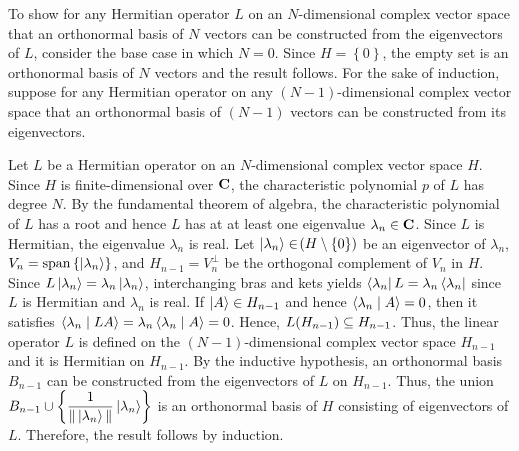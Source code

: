 \begin{answer}
	To show for any Hermitian operator $L$ on an $N$-dimensional complex vector space that an orthonormal basis of $N$ vectors can be constructed from the eigenvectors of $L$, consider the base case in which $N=0$.
	Since $H = \left\{0\right\}$, the empty set is an orthonormal basis of $N$ vectors and the result follows.
	For the sake of induction, suppose for any Hermitian operator on any $(N-1)$-dimensional complex vector space that an orthonormal basis of $(N-1)$ vectors can be constructed from its eigenvectors.

	Let $L$ be a Hermitian operator on an $N$-dimensional complex vector space $H$.
	Since $H$ is finite-dimensional over $\mathbf{C}$, the characteristic polynomial $p$ of $L$ has degree $N$.
	By the fundamental theorem of algebra, the characteristic polynomial of $L$ has a root and hence $L$ has at at least one eigenvalue $\lambda_n \in \mathbf{C}$.
	Since $L$ is Hermitian, the eigenvalue $\lambda_n$ is real.
	Let $\ket{\lambda_n} \in \!\left(H \setminus \{0\}\right)$ be an eigenvector of $\lambda_n$, $V_n = \operatorname{span}\left\{\ket{\lambda_n}\right\}$, and $H_{n-1} = V_n^\perp$ be the orthogonal complement of $V_n$ in $H$.
	Since $L \ket{\lambda_n} = \lambda_n \ket{\lambda_n}$, interchanging bras and kets yields $\bra{\lambda_n} L = \lambda_n \bra{\lambda_n}$ since $L$ is Hermitian and $\lambda_n$ is real.
	If $\ket{A} \in H_{n-1}$ and hence $\braket{\lambda_n \mid A} = 0$, then it satisfies $\braket{\lambda_n \mid L A} = \lambda_n \braket{\lambda_n \mid A} = 0$.
	Hence, $L\!\left(H_{n-1}\right) \subseteq H_{n-1}$.
	Thus, the linear operator $L$ is defined on the $(N-1)$-dimensional complex vector space $H_{n-1}$ and it is Hermitian on $H_{n-1}$.
	By the inductive hypothesis, an orthonormal basis $B_{n-1}$ can be constructed from the eigenvectors of $L$ on $H_{n-1}$.
	Thus, the union $\displaystyle B_{n-1} \cup \left\{\frac{1}{\|\ket{\lambda_n}\|} \ket{\lambda_n} \right\}$ is an orthonormal basis of $H$ consisting of eigenvectors of $L$.
	Therefore, the result follows by induction.
\end{answer}

